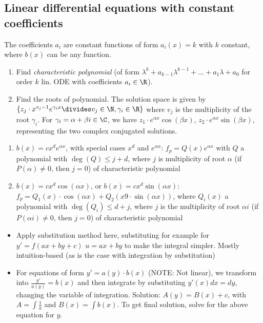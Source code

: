 \newsectionNoPB
\subsection{Linear differential equations with constant coefficients}
The coefficients $a_i$ are constant functions of form $a_i(x) = k$ with $k$ constant, where $b(x)$ can be any function.\\
%
\rmvspace
\begin{enumerate}[noitemsep]
    \item Find \textit{characteristic polynomial} (of form $\lambda^k + a_{k - 1} \lambda^{k - 1} + \ldots + a_1 \lambda + a_0$ for order $k$ lin. ODE with coefficients $a_i \in \R$).
    \item Find the roots of polynomial. The solution space is given by $\{ z_j \cdot x^{v_j - 1} e^{\gamma_i x} \divides v_j \in \N, \gamma_i \in \R \}$ where $v_j$ is the multiplicity of the root $\gamma_i$.
          For $\gamma_i = \alpha + \beta i \in \C$, we have $z_1 \cdot e^{\alpha x}\cos(\beta x)$, $z_2 \cdot e^{\alpha x}\sin(\beta x)$, representing the two complex conjugated solutions.
\end{enumerate}

\rmvspace
{}\rmvspace
\begin{enumerate}[noitemsep]
    \item {} $b(x) = c x^d e^{\alpha x}$, with special cases $x^d$ and $e^{\alpha x}$:
          $f_p = Q(x) e^{\alpha x}$ with $Q$ a polynomial with $\deg(Q) \leq j + d$, where $j$ is multiplicity of root $\alpha$ (if $P(\alpha) \neq 0$, then $j = 0$) of characteristic polynomial
    \item {} $b(x) = c x^d \cos(\alpha x)$, or $b(x) = c x^d \sin(\alpha x)$:
          $f_p = Q_1(x) \cdot \cos(\alpha x) + Q_2(x9 \cdot \sin(\alpha x))$,
          where $Q_i(x)$ a polynomial with $\deg(Q_i) \leq d + j$, where $j$ is the multiplicity of root $\alpha i$ (if $P(\alpha i) \neq 0$, then $j = 0$) of characteristic polynomial
\end{enumerate}

\rmvspace{}\rmvspace
\begin{itemize}[noitemsep]
    \item {} Apply substitution method here, substituting for example for $y' = f(ax + by + c)$ $u = ax + by$ to make the integral simpler.
          Mostly intuition-based (as is the case with integration by substitution)
    \item {} For equations of form $y' = a(y) \cdot b(x)$ (NOTE: Not linear),
          we transform into $\frac{y'}{a(y)} = b(x)$ and then integrate by substituting $y'(x) dx = dy$, changing the variable of integration.
          Solution: $A(y) = B(x) + c$, with $A = \int \frac{1}{a}$ and $B(x) = \int b(x)$.
          To get final solution, solve for the above equation for $y$.
\end{itemize}
